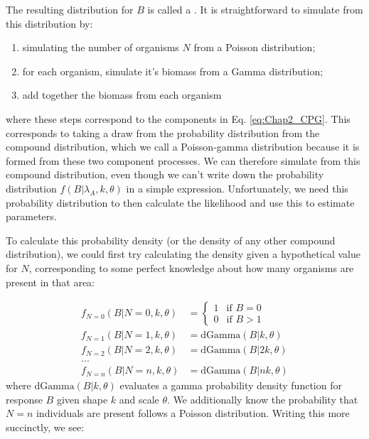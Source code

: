 The resulting distribution for \( B \) is called a .  It is straightforward to simulate from this distribution by:
\begin{enumerate}
  \item simulating the number of organisms \(N\) from a Poisson distribution;
  \item for each organism, simulate it's biomass from a Gamma distribution;
  \item add together the biomass from each organism
\end{enumerate}
where these steps correspond to the components in Eq. \ref{eq:Chap2_CPG}.  This corresponds to taking a draw from the probability distribution from the compound distribution, which we call a Poisson-gamma distribution because it is formed from these two component processes. We can therefore simulate from this compound distribution, even though we can't write down the probability distribution \( f(B | \lambda_A, k, \theta ) \) in a simple expression.  Unfortunately, we need this probability distribution to then calculate the likelihood and use this to estimate parameters.  

To calculate this probability density (or the density of any other compound distribution), we could first try calculating the density given a hypothetical value for \(N\), corresponding to some perfect knowledge about how many organisms are present in that area:

\begin{equation}
\begin{aligned}
    f_{N=0}( B | N = 0, k, \theta ) &= 
    \begin{cases}
        1 & \text{if } B=0 \\ 
        0 & \text{if } B>1 
    \end{cases} \\
    f_{N=1}( B | N = 1, k, \theta ) &= \mathrm{dGamma}( B | k, \theta ) \\
    f_{N=2}( B | N = 2, k, \theta ) &= \mathrm{dGamma}( B | 2k, \theta ) \\
    ... \\
    f_{N=n}( B | N = n, k, \theta ) &= \mathrm{dGamma}( B | nk, \theta )
\end{aligned}
\end{equation}
where \(\mathrm{dGamma}(B | k,\theta)\) evaluates a gamma probability density function for response \(B\) given shape \(k\) and scale \(\theta\).  We additionally know the probability that \( N = n \) individuals are present follows a Poisson distribution. Writing this more succinctly, we see:

